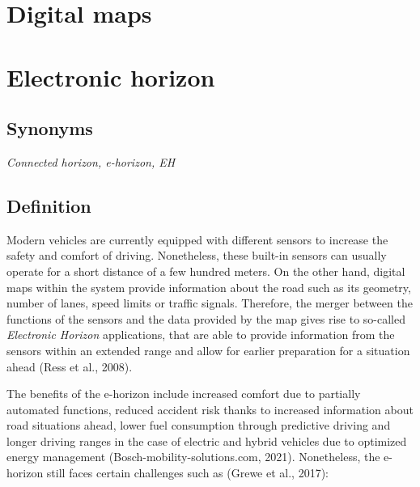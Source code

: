 \documentclass[
]{book}
\begin{document}
\hypertarget{digital_maps}{%
\section{Digital maps}\label{digital_maps}}

\hypertarget{ehorizon}{%
\section{Electronic horizon}\label{ehorizon}}

\hypertarget{synonyms-23}{%
\subsection*{Synonyms}\label{synonyms-23}}

\emph{Connected horizon, e-horizon, EH}

\hypertarget{definition-26}{%
\subsection*{Definition}\label{definition-26}}

Modern vehicles are currently equipped with different sensors to increase the safety and comfort of driving. Nonetheless, these built-in sensors can usually operate for a short distance of a few hundred meters. On the other hand, digital maps within the system provide information about the road such as its geometry, number of lanes, speed limits or traffic signals. Therefore, the merger between the functions of the sensors and the data provided by the map gives rise to so-called \emph{Electronic Horizon} applications, that are able to provide information from the sensors within an extended range and allow for earlier preparation for a situation ahead (Ress et al., 2008).

The benefits of the e-horizon include increased comfort due to partially automated functions, reduced accident risk thanks to increased information about road situations ahead, lower fuel consumption through predictive driving and longer driving ranges in the case of electric and hybrid vehicles due to optimized energy management (Bosch-mobility-solutions.com, 2021). Nonetheless, the e-horizon still faces certain challenges such as (Grewe et al., 2017):
\end{document}
